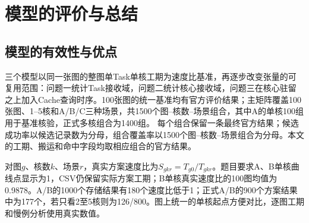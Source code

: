 \section{模型的评价与总结}
\label{sec:evaluation}

\subsection{模型的有效性与优点}
三个模型以同一张图的整图单Task单核工期为速度比基准，再逐步改变张量的可复用范围：问题一统计Task接收域，问题二统计核心接收域，问题三在核心驻留之上加入Cache查询时序。100张图的统一基准均有官方评价结果；主矩阵覆盖100张图、1--5核和A/B/C三种场景，共1500个图--核数--场景组合，其中A的单核100组用于基准核验，正式多核组合为1400组。
每个组合保留一条最终官方结果；候选成功率以候选记录数为分母，组合覆盖率以1500个图--核数--场景组合为分母。本文的工期、搬运和命中字段均取相应组合的官方结果。

对图$g$、核数$k$、场景$r$，真实方案速度比为$S_{gkr}=T_{g0}/T_{gkr}$。题目要求A、B单核曲线点显示为1，CSV仍保留实际方案工期；B单核真实速度比的100图均值为0.9878。A/B的1000个存储结果有180个速度比低于1；正式A/B的900个方案结果中为177个，若只看2至5核则为126/800。图上统一的单核起点方便对比，逐图工期和慢例分析使用真实数值。

